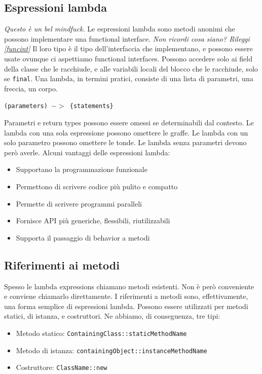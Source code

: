 \documentclass[11pt]{article}
\newcommand{\code}[1]{\texttt{#1}}
\begin{document}
\subsection{Espressioni lambda}
\textit{Questo è un bel mindfuck.} Le espressioni lambda sono metodi anonimi che possono implementare una functional interface. \textit{Non ricordi cosa siano? Rileggi \ref{funcint}} Il loro tipo è il tipo dell'interfaccia che implementano, e possono essere usate ovunque ci aspettiamo functional interfaces. Possono accedere solo ai field della classe che le racchiude, e alle variabili locali del blocco che le racchiude, solo se \code{final}. Una lambda, in termini pratici, consiste di una lista di parametri, una freccia, un corpo.
\begin{center}
    \code{(parameters) $->$ \{statements\}}
\end{center}
Parametri e return types possono essere omessi se determinabili dal contesto.
Le lambda con una sola espressione possono omettere le graffe. Le lambda con un solo parametro possono omettere le tonde. Le lambda senza parametri devono però averle. 
Alcuni vantaggi delle espressioni lambda:
\begin{itemize}
    \item Supportano la programmazione funzionale 
    \item Permettono di scrivere codice più pulito e compatto 
    \item Permette di scrivere programmi paralleli
    \item Fornisce API più generiche, flessibili, riutilizzabili
    \item Supporta il passaggio di behavior a metodi
\end{itemize}
\subsection{Riferimenti ai metodi}
Spesso le lambda expressions chiamano metodi esistenti. Non è però conveniente e conviene chiamarlo direttamente. I riferimenti a metodi sono, effettivamente, una forma semplice di espressioni lambda. Possono essere utilizzati per metodi statici, di istanza, e costruttori. Ne abbiamo, di conseguenza, tre tipi:
\begin{itemize}
    \item Metodo statico: \code{ContainingClass::staticMethodName}
    \item Metodo di istanza: \code{containingObject::instanceMethodName}
    \item Costruttore: \code{ClassName::new}
\end{itemize}
\end{document}

